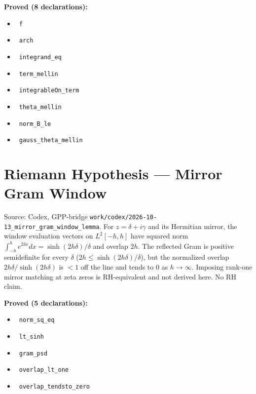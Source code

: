 \documentclass{report}
\theoremstyle{definition}
\begin{document}
\noindent\textbf{Proved (8 declarations):}
\begin{itemize}
  \item {}\leanok\ \texttt{f}
  \item {}\leanok\ \texttt{arch}
  \item {}\leanok\ \texttt{integrand\_eq}
  \item {}\leanok\ \texttt{term\_mellin}
  \item {}\leanok\ \texttt{integrableOn\_term}
  \item {}\leanok\ \texttt{theta\_mellin}
  \item {}\leanok\ \texttt{norm\_B\_le}
  \item {}\leanok\ \texttt{gauss\_theta\_mellin}
\end{itemize}

\section{Riemann Hypothesis --- Mirror Gram Window}
Source: Codex, GPP-bridge \texttt{work/codex/2026-10-13\_mirror\_gram\_window\_lemma}. For $z=\delta+i\gamma$ and its Hermitian mirror, the window evaluation vectors on $L^2[-h,h]$ have squared norm $\int_{-h}^he^{2\delta x}dx=\sinh(2h\delta)/\delta$ and overlap $2h$. The reflected Gram is positive semidefinite for every $\delta$ ($2h\le\sinh(2h\delta)/\delta$), but the normalized overlap $2h\delta/\sinh(2h\delta)$ is $<1$ off the line and tends to $0$ as $h\to\infty$. Imposing rank-one mirror matching at zeta zeros is RH-equivalent and not derived here. No RH claim.

\noindent\textbf{Proved (5 declarations):}
\begin{itemize}
  \item {}\leanok\ \texttt{norm\_sq\_eq}
  \item {}\leanok\ \texttt{lt\_sinh}
  \item {}\leanok\ \texttt{gram\_psd}
  \item {}\leanok\ \texttt{overlap\_lt\_one}
  \item {}\leanok\ \texttt{overlap\_tendsto\_zero}
\end{itemize}
\end{document}
